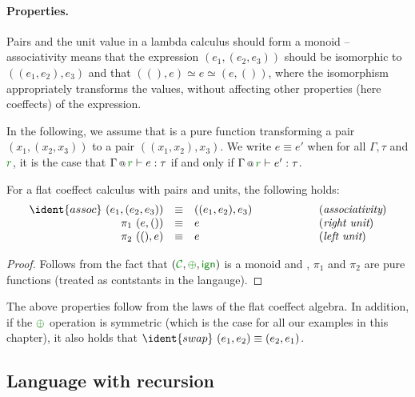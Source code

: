 \paragraph{Properties.}
Pairs and the unit value in a lambda calculus should form a monoid -- associativity means that 
the expression $(e_1, (e_2, e_3))$ should be isomorphic to $((e_1, e_2), e_3)$ and that
$((), e) \simeq e \simeq (e, ())$, where the isomorphism appropriately transforms the values,
without affecting other properties (here coeffects) of the expression. 

In the following, we assume that  is a pure function transforming a pair $(x_1, (x_2, x_3))$ 
to a pair $((x_1, x_2), x_3)$. We write $e \equiv e'$ when for all $\Gamma, \tau$ and $\cclrd{r}$,
it is the case that $\coctx{\Gamma}{\cclrd{r}} \vdash e : \tau$ if and only if
$\coctx{\Gamma}{\cclrd{r}} \vdash e' : \tau$.

\begin{theorem}
For a flat coeffect calculus with pairs and units, the following holds:
%
\begin{equation*}
\begin{array}{rclcl}
 \ident{assoc}~(e_1, (e_2, e_3)) &\equiv& ((e_1, e_2), e_3) &\qquad\qquad&(\emph{associativity}) \\
 \pi_1~(e, ()) &\equiv& e &&(\emph{right unit})\\
 \pi_2~((), e) &\equiv& e &&(\emph{left unit})\\
\end{array} 
\end{equation*}
\end{theorem}
\begin{proof}
Follows from the fact that $(\C, \cpar, \czero)$ is a monoid and , $\pi_1$ and
$\pi_2$ are pure functions (treated as contstants in the langauge).
\end{proof}

The above properties follow from the laws of the flat coeffect algebra. In addition, if the 
$\cpar$ operation is symmetric (which is the case for all our examples in this chapter), it 
also holds that $\ident{swap}~(e_1, e_2) \equiv (e_2, e_1)$.


\subsection{Language with recursion}


